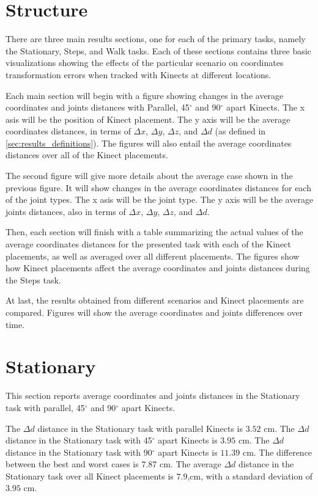 \section{Structure}
\label{sec:results_structure}

There are three main results sections, one for each of the primary tasks, namely the Stationary, Steps, and Walk tasks. Each of these sections contains three basic visualizations showing the effects of the particular scenario on coordinates transformation errors when tracked with Kinects at different locations.

Each main section will begin with a figure showing changes in the average coordinates and joints distances with Parallel, 45$^{\circ}$ and 90$^{\circ}$ apart Kinects. The x asis will be the position of Kinect placement. The y axis will be the average coordinates distances, in terms of $\Delta x$, $\Delta y$, $\Delta z$, and $\Delta d$ (as defined in \ref{sec:results_definitions}). The figures will also entail the average coordinates distances over all of the Kinect placements.

The second figure will give more details about the average case shown in the previous figure. It will show changes in the average coordinates distances for each of the joint types. The x asis will be the joint type. The y axis will be the average joints distances, also in terms of $\Delta x$, $\Delta y$, $\Delta z$, and $\Delta d$.

Then, each section will finish with a table summarizing the actual values of the average coordinates distances for the presented task with each of the Kinect placements, as well as averaged over all different placements. The figures show how Kinect placements affect the average coordinates and joints distances during the Steps task.

At last, the results obtained from different scenarios and Kinect placements are compared. Figures will show the average coordinates and joints differences over time.

\section{Stationary}
\label{sec:results_stationary}

This section reports average coordinates and joints distances in the Stationary task with parallel, 45$^{\circ}$ and 90$^{\circ}$ apart Kinects.

The $\Delta d$ distance in the Stationary task with parallel Kinects is $3.52$ cm. The $\Delta d$ distance in the Stationary task with 45$^{\circ}$ apart Kinects is $3.95$ cm. The $\Delta d$ distance in the Stationary task with 90$^{\circ}$ apart Kinects is $11.39$ cm. The difference between the best and worst cases is $7.87$ cm. The average $\Delta d$ distance in the Stationary task over all Kinect placements is $7.9$,cm, with a standard deviation of $3.95$ cm.

